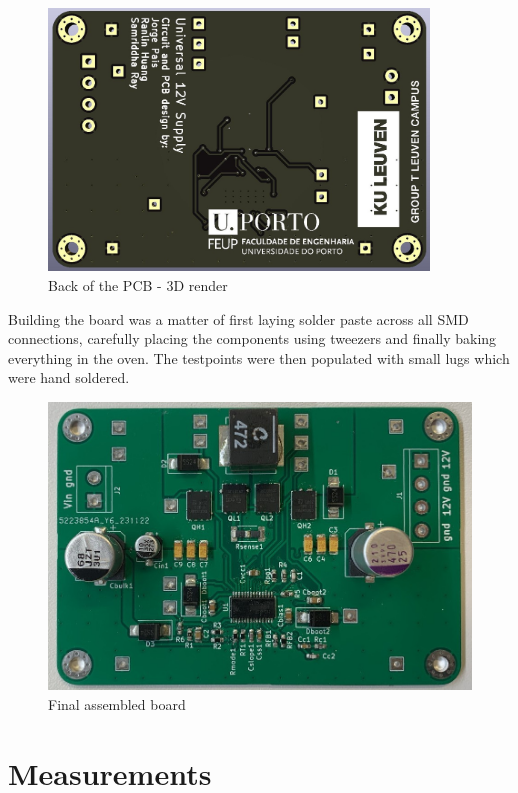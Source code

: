 \documentclass[11pt, a4paper]{article}
\begin{document}
\begin{figure}[H]
    \centering
    \includegraphics[width=0.9\textwidth]{./figures/pcbBack.jpg}
    \caption{Back of the PCB - 3D render}
    \label{fig:pcbback}
\end{figure}

Building the board was a matter of first laying solder paste across all SMD connections, carefully placing the components using tweezers and finally baking everything in the oven. The testpoints were then populated with small lugs which were hand soldered.

\begin{figure}[H]
    \centering
    \includegraphics[width=\textwidth]{./figures/assembledBoard.jpg}
    \caption{Final assembled board}
    \label{fig:assembledBoard}
\end{figure}

\section{Measurements}

\vfill \pagebreak
\printbibliography

\vfill \pagebreak


\begin{appendices}
    
    
\end{appendices}
\end{document}
